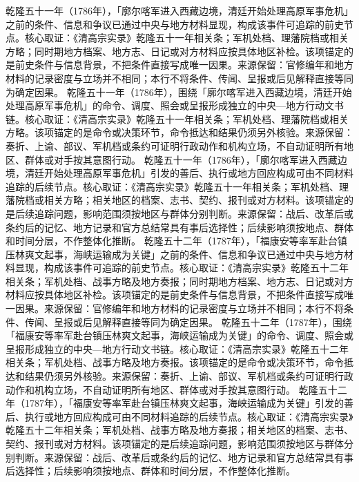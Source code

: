 乾隆五十一年（1786年），「廓尔喀军进入西藏边境，清廷开始处理高原军事危机」之前的条件、信息和争议已通过中央与地方材料显现，构成该事件可追踪的前史节点。核心取证：《清高宗实录》乾隆五十一年相关条；军机处档、理藩院档或相关方略；同时期地方档案、地方志、日记或对方材料应按具体地区补检。该项锚定的是前史条件与信息背景，不把条件直接写成唯一因果。来源保留：官修编年和地方材料的记录密度与立场并不相同；本行不将条件、传闻、呈报或后见解释直接等同为确定因果。
乾隆五十一年（1786年），围绕「廓尔喀军进入西藏边境，清廷开始处理高原军事危机」的命令、调度、照会或呈报形成独立的中央—地方行动文书链。核心取证：《清高宗实录》乾隆五十一年相关条；军机处档、理藩院档或相关方略。该项锚定的是命令或决策环节，命令抵达和结果仍须另外核验。来源保留：奏折、上谕、部议、军机档或条约可证明行政动作和机构立场，不自动证明所有地区、群体或对手按其意图行动。
乾隆五十一年（1786年），「廓尔喀军进入西藏边境，清廷开始处理高原军事危机」引发的善后、执行或地方回应构成可由不同材料追踪的后续节点。核心取证：《清高宗实录》乾隆五十一年相关条；军机处档、理藩院档或相关方略；相关地区的档案、志书、契约、报刊或对方材料。该项锚定的是后续追踪问题，影响范围须按地区与群体分别判断。来源保留：战后、改革后或条约后的记忆、地方记录和官方总结常具有事后选择性；后续影响须按地点、群体和时间分层，不作整体化推断。
乾隆五十二年（1787年），「福康安等率军赴台镇压林爽文起事，海峡运输成为关键」之前的条件、信息和争议已通过中央与地方材料显现，构成该事件可追踪的前史节点。核心取证：《清高宗实录》乾隆五十二年相关条；军机处档、战事方略及地方奏报；同时期地方档案、地方志、日记或对方材料应按具体地区补检。该项锚定的是前史条件与信息背景，不把条件直接写成唯一因果。来源保留：官修编年和地方材料的记录密度与立场并不相同；本行不将条件、传闻、呈报或后见解释直接等同为确定因果。
乾隆五十二年（1787年），围绕「福康安等率军赴台镇压林爽文起事，海峡运输成为关键」的命令、调度、照会或呈报形成独立的中央—地方行动文书链。核心取证：《清高宗实录》乾隆五十二年相关条；军机处档、战事方略及地方奏报。该项锚定的是命令或决策环节，命令抵达和结果仍须另外核验。来源保留：奏折、上谕、部议、军机档或条约可证明行政动作和机构立场，不自动证明所有地区、群体或对手按其意图行动。
乾隆五十二年（1787年），「福康安等率军赴台镇压林爽文起事，海峡运输成为关键」引发的善后、执行或地方回应构成可由不同材料追踪的后续节点。核心取证：《清高宗实录》乾隆五十二年相关条；军机处档、战事方略及地方奏报；相关地区的档案、志书、契约、报刊或对方材料。该项锚定的是后续追踪问题，影响范围须按地区与群体分别判断。来源保留：战后、改革后或条约后的记忆、地方记录和官方总结常具有事后选择性；后续影响须按地点、群体和时间分层，不作整体化推断。
